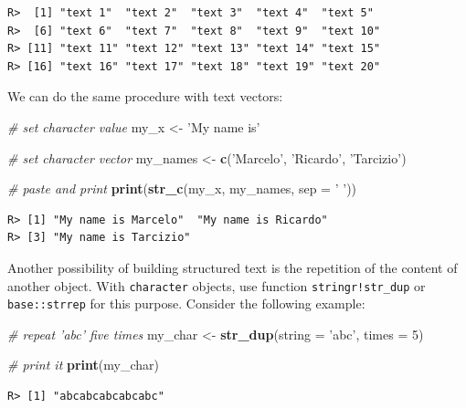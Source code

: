 \documentclass[
  12pt,
]{book}
\newenvironment{Shaded}{\begin{snugshade}}{\end{snugshade}}
\newcommand{\CommentTok}[1]{\textcolor[rgb]{0.37,0.37,0.37}{\textit{#1}}}
\newcommand{\DataTypeTok}[1]{\textcolor[rgb]{0.27,0.27,0.27}{#1}}
\newcommand{\DecValTok}[1]{\textcolor[rgb]{0.06,0.06,0.06}{#1}}
\newcommand{\KeywordTok}[1]{\textcolor[rgb]{0.27,0.27,0.27}{\textbf{#1}}}
\newcommand{\NormalTok}[1]{#1}
\newcommand{\StringTok}[1]{\textcolor[rgb]{0.5,0.5,0.5}{#1}}
\begin{document}
\begin{verbatim}
R>  [1] "text 1"  "text 2"  "text 3"  "text 4"  "text 5" 
R>  [6] "text 6"  "text 7"  "text 8"  "text 9"  "text 10"
R> [11] "text 11" "text 12" "text 13" "text 14" "text 15"
R> [16] "text 16" "text 17" "text 18" "text 19" "text 20"
\end{verbatim}

We can do the same procedure with text vectors:

\begin{Shaded}
\begin{Highlighting}[]
\CommentTok{# set character value}
\NormalTok{my_x <-}\StringTok{ 'My name is'}

\CommentTok{# set character vector}
\NormalTok{my_names <-}\StringTok{ }\KeywordTok{c}\NormalTok{(}\StringTok{'Marcelo'}\NormalTok{, }\StringTok{'Ricardo'}\NormalTok{, }\StringTok{'Tarcizio'}\NormalTok{)}

\CommentTok{# paste and print}
\KeywordTok{print}\NormalTok{(}\KeywordTok{str_c}\NormalTok{(my_x, my_names, }\DataTypeTok{sep =} \StringTok{' '}\NormalTok{))}
\end{Highlighting}
\end{Shaded}

\begin{verbatim}
R> [1] "My name is Marcelo"  "My name is Ricardo" 
R> [3] "My name is Tarcizio"
\end{verbatim}

Another possibility of building structured text is the repetition of the content of another object. With \texttt{character} objects, use function \texttt{stringr!str\_dup} or \texttt{base::strrep} for this purpose. Consider the following example:  

\begin{Shaded}
\begin{Highlighting}[]
\CommentTok{# repeat 'abc' five times}
\NormalTok{my_char <-}\StringTok{ }\KeywordTok{str_dup}\NormalTok{(}\DataTypeTok{string =} \StringTok{'abc'}\NormalTok{, }\DataTypeTok{times =} \DecValTok{5}\NormalTok{)}

\CommentTok{# print it}
\KeywordTok{print}\NormalTok{(my_char)}
\end{Highlighting}
\end{Shaded}

\begin{verbatim}
R> [1] "abcabcabcabcabc"
\end{verbatim}
\end{document}
